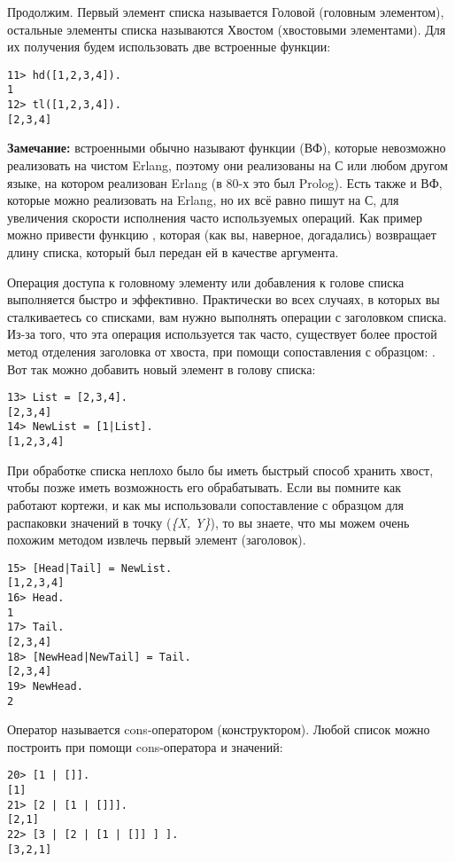 Продолжим.
Первый элемент списка называется Головой (головным элементом), остальные элементы списка называются Хвостом (хвостовыми элементами).
Для их получения будем использовать две встроенные функции:
\begin{lstlisting}[style=repl]
11> hd([1,2,3,4]).
1
12> tl([1,2,3,4]).
[2,3,4]
\end{lstlisting}
\colorbox{lgray}
{
    \begin{minipage}{1.0\linewidth}
        \textbf{Замечание:} встроенными обычно называют функции (ВФ), которые невозможно реализовать на чистом Erlang, поэтому они реализованы на С или любом другом языке, на котором реализован Erlang (в 80\--х это был Prolog).
        Есть также и ВФ, которые можно реализовать на Erlang, но их всё равно пишут на С, для увеличения скорости исполнения часто используемых операций.
        Как пример можно привести функцию , которая (как вы, наверное, догадались) возвращает длину списка, который был передан ей в качестве аргумента.
    \end{minipage}
}

Операция доступа к головному элементу или добавления к голове списка выполняется быстро и эффективно.
Практически во всех случаях, в которых вы сталкиваетесь со списками, вам нужно выполнять операции с заголовком списка.
Из\--за того, что эта операция используется так часто, существует более простой метод отделения заголовка от хвоста, при помощи сопоставления с образцом: .
Вот так можно добавить новый элемент в голову списка:
\begin{lstlisting}[style=repl]
13> List = [2,3,4].
[2,3,4]
14> NewList = [1|List].
[1,2,3,4]
\end{lstlisting}

При обработке списка неплохо было бы иметь быстрый способ хранить хвост, чтобы позже иметь возможность его обрабатывать.
Если вы помните как работают кортежи, и как мы использовали сопоставление с образцом для распаковки значений в точку (\emph{\{X, Y\}}), то вы знаете, что мы можем очень похожим методом извлечь первый элемент (заголовок).
\begin{lstlisting}[style=repl]
15> [Head|Tail] = NewList.
[1,2,3,4]
16> Head.
1
17> Tail.
[2,3,4]
18> [NewHead|NewTail] = Tail.
[2,3,4]
19> NewHead.
2
\end{lstlisting}

Оператор \ops{|} называется cons\--оператором (конструктором).
Любой список можно построить при помощи cons\--оператора и значений:
\begin{lstlisting}[style=repl]
20> [1 | []].
[1]
21> [2 | [1 | []]].
[2,1]
22> [3 | [2 | [1 | []] ] ].
[3,2,1]
\end{lstlisting}

